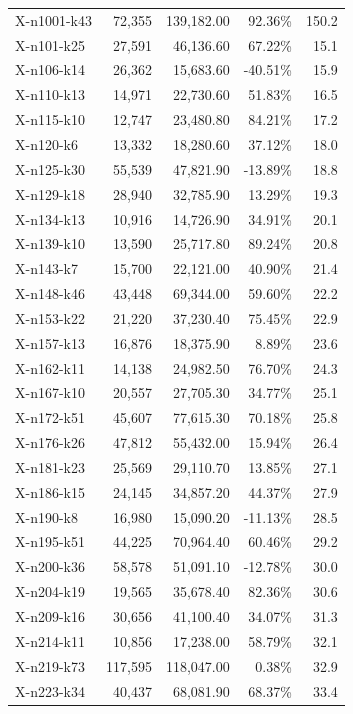 \documentclass[12pt,a4paper]{article}
\begin{document}
\begin{longtable}{@{}lrrrr@{}}
    X-n1001-k43 & 72,355 & 139,182.00 & 92.36\% & 150.2 \\
    X-n101-k25 & 27,591 & 46,136.60 & 67.22\% & 15.1 \\
    X-n106-k14 & 26,362 & 15,683.60 & -40.51\% & 15.9 \\
    X-n110-k13 & 14,971 & 22,730.60 & 51.83\% & 16.5 \\
    X-n115-k10 & 12,747 & 23,480.80 & 84.21\% & 17.2 \\
    X-n120-k6 & 13,332 & 18,280.60 & 37.12\% & 18.0 \\
    X-n125-k30 & 55,539 & 47,821.90 & -13.89\% & 18.8 \\
    X-n129-k18 & 28,940 & 32,785.90 & 13.29\% & 19.3 \\
    X-n134-k13 & 10,916 & 14,726.90 & 34.91\% & 20.1 \\
    X-n139-k10 & 13,590 & 25,717.80 & 89.24\% & 20.8 \\
    X-n143-k7 & 15,700 & 22,121.00 & 40.90\% & 21.4 \\
    X-n148-k46 & 43,448 & 69,344.00 & 59.60\% & 22.2 \\
    X-n153-k22 & 21,220 & 37,230.40 & 75.45\% & 22.9 \\
    X-n157-k13 & 16,876 & 18,375.90 & 8.89\% & 23.6 \\
    X-n162-k11 & 14,138 & 24,982.50 & 76.70\% & 24.3 \\
    X-n167-k10 & 20,557 & 27,705.30 & 34.77\% & 25.1 \\
    X-n172-k51 & 45,607 & 77,615.30 & 70.18\% & 25.8 \\
    X-n176-k26 & 47,812 & 55,432.00 & 15.94\% & 26.4 \\
    X-n181-k23 & 25,569 & 29,110.70 & 13.85\% & 27.1 \\
    X-n186-k15 & 24,145 & 34,857.20 & 44.37\% & 27.9 \\
    X-n190-k8 & 16,980 & 15,090.20 & -11.13\% & 28.5 \\
    X-n195-k51 & 44,225 & 70,964.40 & 60.46\% & 29.2 \\
    X-n200-k36 & 58,578 & 51,091.10 & -12.78\% & 30.0 \\
    X-n204-k19 & 19,565 & 35,678.40 & 82.36\% & 30.6 \\
    X-n209-k16 & 30,656 & 41,100.40 & 34.07\% & 31.3 \\
    X-n214-k11 & 10,856 & 17,238.00 & 58.79\% & 32.1 \\
    X-n219-k73 & 117,595 & 118,047.00 & 0.38\% & 32.9 \\
    X-n223-k34 & 40,437 & 68,081.90 & 68.37\% & 33.4 \\

\end{longtable}
\end{document}
